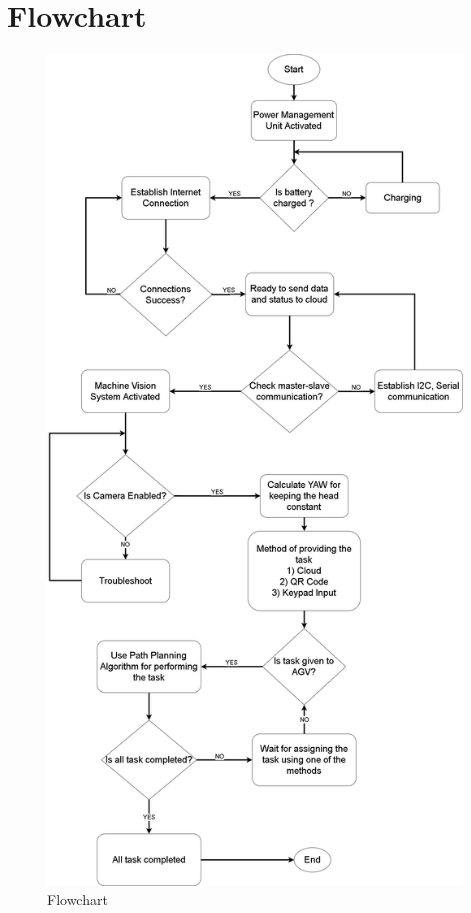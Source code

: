 \newpage
\section{Flowchart}

\begin{figure}[H]
\centering
\includegraphics[width =11cm]{project/images/Flowchart.png}
\caption{Flowchart}
\end{figure}
\newpage
